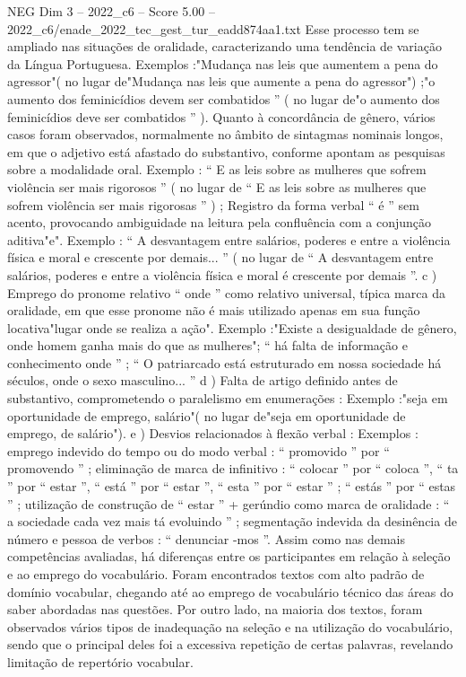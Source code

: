 \begin{textsample}{NEG Dim 3 – 2022\_c6 – Score 5.00 – 2022\_c6/enade\_2022\_tec\_gest\_tur\_eadd874aa1.txt}
Esse processo tem se ampliado nas situações de oralidade, caracterizando uma tendência de variação da Língua Portuguesa.
Exemplos :"Mudança nas leis que aumentem a pena do agressor"( no lugar de"Mudança nas leis que aumente a pena do agressor") ;"o aumento dos feminicídios devem ser combatidos ” ( no lugar de"o aumento dos feminicídios deve ser combatidos ” ).
Quanto à concordância de gênero, vários casos foram observados, normalmente no âmbito de sintagmas nominais longos, em que o adjetivo está afastado do substantivo, conforme apontam as pesquisas sobre a modalidade oral.
Exemplo : “ E as leis sobre as mulheres que sofrem violência ser mais rigorosos ” ( no lugar de “ E as leis sobre as mulheres que sofrem violência ser mais rigorosas ” ) ; Registro da forma verbal “ é ” sem acento, provocando ambiguidade na leitura pela confluência com a conjunção aditiva"e".
Exemplo : “ A desvantagem entre salários, poderes e entre a violência física e moral e crescente por demais... ” ( no lugar de “ A desvantagem entre salários, poderes e entre a violência física e moral é crescente por demais ”. c ) Emprego do pronome relativo “ onde ” como relativo universal, típica marca da oralidade, em que esse pronome não é mais utilizado apenas em sua função locativa"lugar onde se realiza a ação".
Exemplo :"Existe a desigualdade de gênero, onde homem ganha mais do que as mulheres"; “ há falta de informação e conhecimento onde ” ; “ O patriarcado está estruturado em nossa sociedade há séculos, onde o sexo masculino... ” d ) Falta de artigo definido antes de substantivo, comprometendo o paralelismo em enumerações : Exemplo :"seja em oportunidade de emprego, salário"( no lugar de"seja em oportunidade de emprego, de salário"). e ) Desvios relacionados à flexão verbal : Exemplos : emprego indevido do tempo ou do modo verbal : “ promovido ” por “ promovendo ” ; eliminação de marca de infinitivo : “ colocar ” por “ coloca ”, “ ta ” por “ estar ”, “ está ” por “ estar ”, “ esta ” por “ estar ” ; “ estás ” por “ estas ” ; utilização de construção de “ estar ” + gerúndio como marca de oralidade : “ a sociedade cada vez mais tá evoluindo ” ; segmentação indevida da desinência de número e pessoa de verbos : “ denunciar -mos ”.
Assim como nas demais competências avaliadas, há diferenças entre os participantes em relação à seleção e ao emprego do vocabulário.
Foram encontrados textos com alto padrão de domínio vocabular, chegando até ao emprego de vocabulário técnico das áreas do saber abordadas nas questões.
Por outro lado, na maioria dos textos, foram observados vários tipos de inadequação na seleção e na utilização do vocabulário, sendo que o principal deles foi a excessiva repetição de certas palavras, revelando limitação de repertório vocabular.

\end{textsample}
